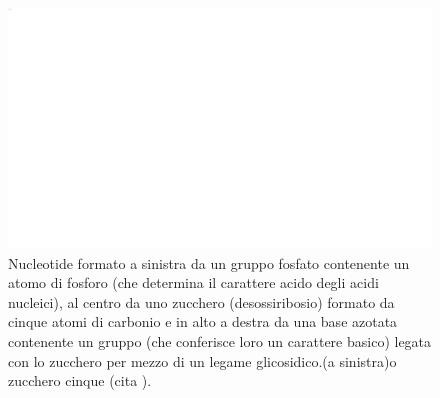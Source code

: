 \documentclass[12pt,a4paper,twoside]{report}
\begin{document}
	\begin{figure}[H]
		\centering
		\includegraphics[width=0.9\linewidth]{nucleotide.pdf}
		\caption{Nucleotide formato a sinistra da un gruppo fosfato contenente un atomo di fosforo  (che determina il carattere acido degli acidi nucleici), al centro da uno zucchero (desossiribosio) formato da cinque atomi di carbonio e in alto a destra da una base azotata contenente un gruppo  (che conferisce loro un carattere basico) legata con lo zucchero per mezzo di un legame glicosidico.(a sinistra)o zucchero cinque (cita
			).}
		\label{fig:nucleotide}
	\end{figure}
	
\end{document}
